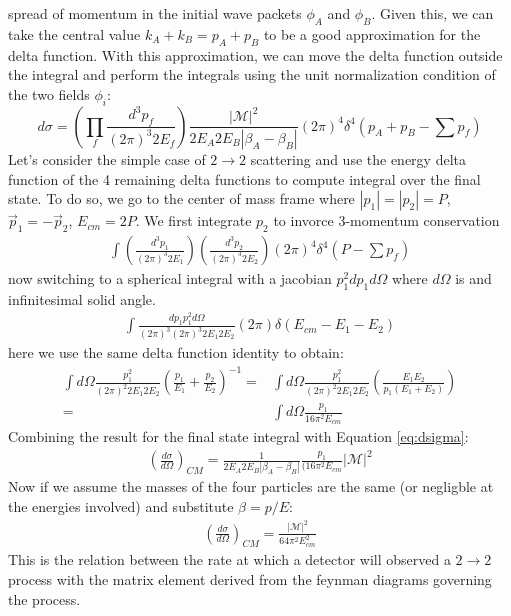spread of momentum in the initial wave packets $\phi_A$ and $\phi_B$. Given this, we can take the central value $k_A+k_B=p_A+p_B$
to be a good approximation for the delta function. With this approximation, we can move the delta function outside the integral and
perform the integrals using the unit normalization condition of the two fields $\phi_i$:
\begin{equation} \label{eq:dsigma}
d\sigma = \left( \prod_f \frac{d^3p_f}{(2\pi)^3 2E_f} \right ) \frac{|\mathcal{M}|^2}{2E_A2E_B|\beta_A - \beta_B|} (2\pi)^4
\delta^4 \left (p_A+p_B - \sum p_f  \right )
\end{equation}
Let's consider the simple case of $2 \rightarrow 2$ scattering and use the energy delta function 
of the 4 remaining delta functions to compute integral over the final state.
To do so, we go to the center of mass frame where $|p_1| = |p_2|= P$, $\vec p_1 = - \vec p_2$, $E_{cm} = 2P$. We first
integrate $p_2$ to invorce 3-momentum conservation  
\begin{align*}
\int \left( \frac{d^3p_1}{(2\pi)^3 2E_1} \right )\left( \frac{d^3p_2}{(2\pi)^3 2E_2} \right )  (2\pi)^4 \delta^4( P - \sum p_f ) 
\end{align*}
now switching to a spherical integral with a jacobian $p_1^2 dp_1 d\Omega$ where $d\Omega$ is and infinitesimal solid angle.
\begin{align*}
\int \frac{dp_1 p_1^2 d\Omega}{(2\pi)^3 (2\pi)^3 2E_1 2E_2} (2\pi)\delta( E_{cm} -E_1 - E_2)
\end{align*}
here we use the same delta function identity to obtain:
\begin{align*}
\int d\Omega \frac{p_1^2}{(2\pi)^2 2E_1 2E_2} \left ( \frac{p_1}{E_1} + \frac{p_2}{E_2} \right )^{-1} = &\int d\Omega \frac{p_1^2}{(2\pi)^2 2E_1 2E_2} \left ( \frac{E_1E_2}{p_1(E_1+E_2)} \right ) 
\\= &\int d\Omega \frac{p_1}{16\pi^2 E_{cm}}
\end{align*}
Combining the result for the final state integral with Equation \ref{eq:dsigma}:
\begin{align*}
\left (\frac{d\sigma}{d\Omega} \right)_{CM}  = \frac{1}{2E_A2E_B|\beta_A - \beta_B|}  \frac{p_1}{(16\pi^2 E_{cm}} |\mathcal{M}|^2
\end{align*}
Now if we assume the masses of the four particles are the same (or negligble at the energies involved) 
and substitute $\beta = p / E$:
\begin{align*}
\left (\frac{d\sigma}{d\Omega}\right)_{CM}  = \frac{|\mathcal{M}|^2}{64\pi^2E_{cm}^2} 
\end{align*}
This is the relation between the rate at which a detector will observed a $2\rightarrow 2$ process with the matrix element
derived from the feynman diagrams governing the process. 



